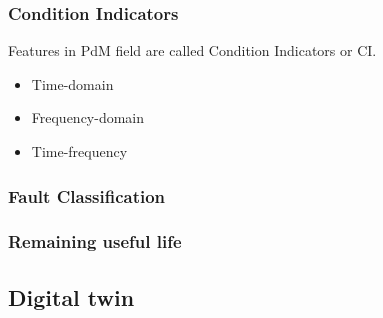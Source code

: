 \documentclass[class=article, crop=false]{standalone}
\begin{document}

\subsubsection{Condition Indicators}
Features in PdM field are called Condition Indicators or CI.
\begin{itemize}
    \item Time-domain
    \item Frequency-domain
    \item Time-frequency
\end{itemize}

\subsubsection{Fault Classification}
\subsubsection{Remaining useful life}


\subsection{Digital twin}
\end{document}
